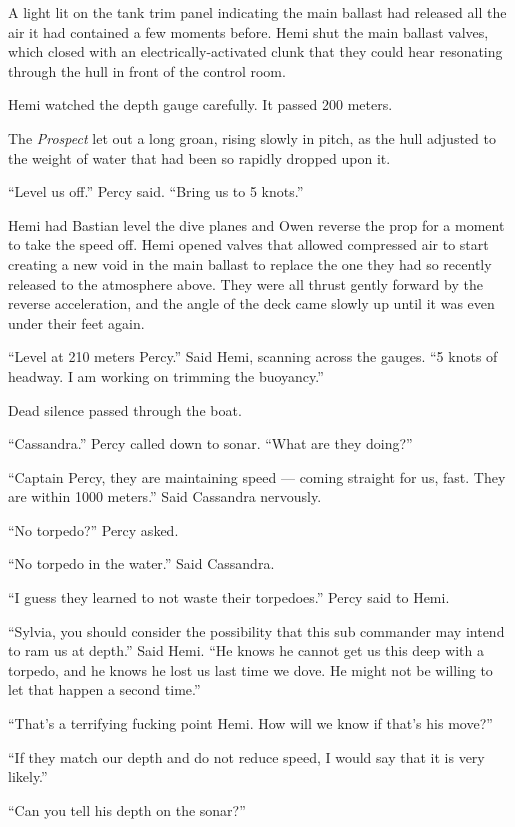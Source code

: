 \documentclass[
]{scrbook}
\begin{document}
A light lit on the tank trim panel indicating the main ballast had
released all the air it had contained a few moments before. Hemi shut
the main ballast valves, which closed with an electrically-activated
clunk that they could hear resonating through the hull in front of the
control room.

Hemi watched the depth gauge carefully. It passed 200 meters.

The \emph{Prospect} let out a long groan, rising slowly in pitch, as the
hull adjusted to the weight of water that had been so rapidly dropped
upon it.

``Level us off.'' Percy said. ``Bring us to 5 knots.''

Hemi had Bastian level the dive planes and Owen reverse the prop for a
moment to take the speed off. Hemi opened valves that allowed compressed
air to start creating a new void in the main ballast to replace the one
they had so recently released to the atmosphere above. They were all
thrust gently forward by the reverse acceleration, and the angle of the
deck came slowly up until it was even under their feet again.

``Level at 210 meters Percy.'' Said Hemi, scanning across the gauges.
``5 knots of headway. I am working on trimming the buoyancy.''

Dead silence passed through the boat.

``Cassandra.'' Percy called down to sonar. ``What are they doing?''

``Captain Percy, they are maintaining speed --- coming straight for us,
fast. They are within 1000 meters.'' Said Cassandra nervously.

``No torpedo?'' Percy asked.

``No torpedo in the water.'' Said Cassandra.

``I guess they learned to not waste their torpedoes.'' Percy said to
Hemi.

``Sylvia, you should consider the possibility that this sub commander
may intend to ram us at depth.'' Said Hemi. ``He knows he cannot get us
this deep with a torpedo, and he knows he lost us last time we dove. He
might not be willing to let that happen a second time.''

``That's a terrifying fucking point Hemi. How will we know if that's his
move?''

``If they match our depth and do not reduce speed, I would say that it
is very likely.''

``Can you tell his depth on the sonar?''
\end{document}
